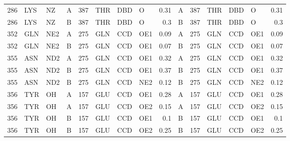 \begin{longtable}{rlllrlllrlrlllr}
       286 & LYS        & NZ     & A         &         387 & THR          & DBD         & O        &          0.31 & A         &         387 & THR          & DBD         & O        &          0.31 \\
       286 & LYS        & NZ     & B         &         387 & THR          & DBD         & O        &          0.3  & B         &         387 & THR          & DBD         & O        &          0.3  \\
       352 & GLN        & NE2    & A         &         275 & GLN          & CCD         & OE1      &          0.09 & A         &         275 & GLN          & CCD         & OE1      &          0.09 \\
       352 & GLN        & NE2    & B         &         275 & GLN          & CCD         & OE1      &          0.07 & B         &         275 & GLN          & CCD         & OE1      &          0.07 \\
       355 & ASN        & ND2    & A         &         275 & GLN          & CCD         & OE1      &          0.32 & A         &         275 & GLN          & CCD         & OE1      &          0.32 \\
       355 & ASN        & ND2    & B         &         275 & GLN          & CCD         & OE1      &          0.37 & B         &         275 & GLN          & CCD         & OE1      &          0.37 \\
       355 & ASN        & ND2    & B         &         275 & GLN          & CCD         & NE2      &          0.12 & B         &         275 & GLN          & CCD         & NE2      &          0.12 \\
       356 & TYR        & OH     & A         &         157 & GLU          & CCD         & OE1      &          0.28 & A         &         157 & GLU          & CCD         & OE1      &          0.28 \\
       356 & TYR        & OH     & A         &         157 & GLU          & CCD         & OE2      &          0.15 & A         &         157 & GLU          & CCD         & OE2      &          0.15 \\
       356 & TYR        & OH     & B         &         157 & GLU          & CCD         & OE1      &          0.1  & B         &         157 & GLU          & CCD         & OE1      &          0.1  \\
       356 & TYR        & OH     & B         &         157 & GLU          & CCD         & OE2      &          0.25 & B         &         157 & GLU          & CCD         & OE2      &          0.25 \\

\end{longtable}
